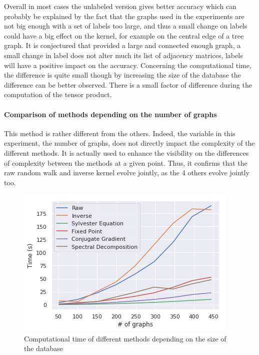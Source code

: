 \documentclass{article}
\theoremstyle{definition}
\begin{document}
Overall in most cases the unlabeled version gives better accuracy which can probably be explained by the fact that the graphs used in the experiments are not big enough with a set of labels too large, and thus a small change on labels could have a big effect on the kernel, for example on the central edge of a tree graph. It is conjectured that provided a large and connected enough graph, a small change in label does not alter much its list of adjacency matrices, labels will have a positive impact on the accuracy. Concerning the computational time, the difference is quite small though by increasing the size of the database the difference can be better observed. There is a small factor of difference during the computation of the tensor product.
\paragraph{Comparison of methods depending on the number of graphs}
This method is rather different from the others. Indeed, the variable in this experiment, the number of graphs, does not directly impact the complexity of the different methods. It is actually used to enhance the visibility on the differences of complexity between the methods at a given point. Thus, it confirms that the raw random walk and inverse kernel evolve jointly, as the 4 others evolve jointly too. 
\begin{figure}[!htb]
	\centering
		\includegraphics[width=.5\linewidth]{data/nb_graph/time.png}\par
	\caption{Computational time of different methods depending on the size of the database}
\end{figure}
\end{document}
